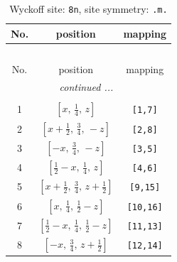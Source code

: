 \documentclass[fleqn,8pt]{jsarticle}
\begin{document}
\begin{longtable}{ccc}
\caption{Wyckoff site: {\tt 8n}, site symmetry: {\tt .m.}}
 \\
 \hline \hline
No. & position & mapping \\ \hline \endfirsthead

\multicolumn{2}{l}{\tablename\ \thetable{}} \\
 \hline \hline
No. & position & mapping \\ \hline \endhead

 \hline \hline
\multicolumn{2}{r}{\footnotesize\it continued ...} \\ \endfoot

 \hline \hline
\multicolumn{2}{r}{} \\ \endlastfoot

1 & $\left[ x,\, \frac{1}{4},\, z \right]$ & {\tt [1,7]} \\ \hline
2 & $\left[ x + \frac{1}{2},\, \frac{3}{4},\, - z \right]$ & {\tt [2,8]} \\ \hline
3 & $\left[ - x,\, \frac{3}{4},\, - z \right]$ & {\tt [3,5]} \\ \hline
4 & $\left[ \frac{1}{2} - x,\, \frac{1}{4},\, z \right]$ & {\tt [4,6]} \\ \hline
5 & $\left[ x + \frac{1}{2},\, \frac{3}{4},\, z + \frac{1}{2} \right]$ & {\tt [9,15]} \\ \hline
6 & $\left[ x,\, \frac{1}{4},\, \frac{1}{2} - z \right]$ & {\tt [10,16]} \\ \hline
7 & $\left[ \frac{1}{2} - x,\, \frac{1}{4},\, \frac{1}{2} - z \right]$ & {\tt [11,13]} \\ \hline
8 & $\left[ - x,\, \frac{3}{4},\, z + \frac{1}{2} \right]$ & {\tt [12,14]} \\
\end{longtable}
\renewcommand{\arraystretch}{1.2}
\end{document}
